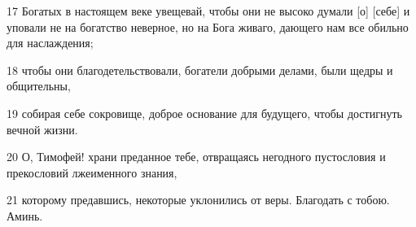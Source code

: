 \par 17 Богатых в настоящем веке увещевай, чтобы они не высоко думали [о] [себе] и уповали не на богатство неверное, но на Бога живаго, дающего нам все обильно для наслаждения;
\par 18 чтобы они благодетельствовали, богатели добрыми делами, были щедры и общительны,
\par 19 собирая себе сокровище, доброе основание для будущего, чтобы достигнуть вечной жизни.
\par 20 О, Тимофей! храни преданное тебе, отвращаясь негодного пустословия и прекословий лжеименного знания,
\par 21 которому предавшись, некоторые уклонились от веры. Благодать с тобою. Аминь.


